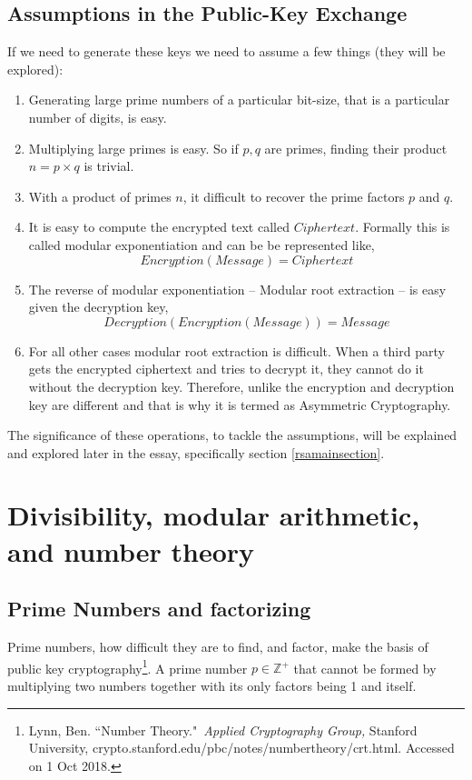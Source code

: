 \documentclass[a4paper,12pt]{article}
\theoremstyle{definition}
\begin{document}
\newpage
\subsection{Assumptions in the Public-Key Exchange} \label{assumptions}
If we need to generate these keys we need to assume a few things (they will be explored):
\begin{enumerate}
	\item Generating large prime numbers of a particular bit-size, that is a particular number of digits, is easy.
	\item Multiplying large primes is easy. So if $p,q$ are primes, finding their product $n=p \times q$ is trivial.
	\item With a product of primes $n$, it difficult to recover the prime factors $p$ and $q$.
	\item  It is easy to compute the encrypted text called $Ciphertext$.   Formally this is called modular exponentiation and can be be represented like,
	\begin{equation}
		Encryption(Message) = Ciphertext
	\end{equation}
	\item  The reverse of modular exponentiation -- Modular root extraction -- is easy given the decryption key,
	\begin{equation}
		Decryption(Encryption(Message)) = Message
	\end{equation}
	\item For all other cases modular root extraction is difficult. When a third party gets the encrypted ciphertext and tries to decrypt it, they cannot do it without the decryption key. Therefore, unlike the encryption and decryption key are different and that is why it is termed as Asymmetric Cryptography.
\end{enumerate}

The significance of these operations, to tackle the assumptions, will be explained and explored later in the essay, specifically section \ref{rsamainsection}.

\newpage
\section{Divisibility, modular arithmetic, and number theory}
\subsection{Prime Numbers and factorizing}
Prime numbers, how difficult they are to find, and factor, make the basis of public key cryptography\footnote{Lynn, Ben. ``Number Theory." \textit{Applied Cryptography Group,} Stanford University, crypto.stanford.edu/pbc/notes/numbertheory/crt.html. Accessed on 1 Oct 2018.}. A prime number $p \in \mathbb{Z}^+$ that cannot be formed by multiplying two numbers together with its only factors being 1 and itself.
\end{document}
